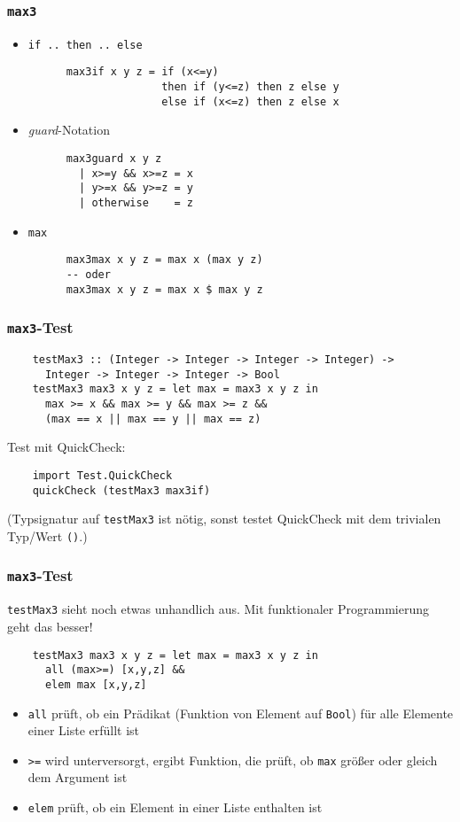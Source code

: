 \documentclass{beamer}
\begin{document}
\begin{frame}[fragile]
  \frametitle{\lstinline{max3}}
  \begin{itemize}
  \item \lstinline{if .. then .. else}
    \pause
    \begin{lstlisting}
      max3if x y z = if (x<=y)
                     then if (y<=z) then z else y
                     else if (x<=z) then z else x
    \end{lstlisting}
    \pause
  \item \emph{guard}-Notation
    \pause
    \begin{lstlisting}
      max3guard x y z
        | x>=y && x>=z = x
        | y>=x && y>=z = y
        | otherwise    = z
    \end{lstlisting}
    \pause
  \item \lstinline{max}
    \pause
    \begin{lstlisting}
      max3max x y z = max x (max y z)
      -- oder
      max3max x y z = max x $ max y z
    \end{lstlisting}
  \end{itemize}
\end{frame}

\begin{frame}[fragile]
  \frametitle{\lstinline{max3}-Test}
  \begin{lstlisting}
    testMax3 :: (Integer -> Integer -> Integer -> Integer) ->
      Integer -> Integer -> Integer -> Bool
    testMax3 max3 x y z = let max = max3 x y z in
      max >= x && max >= y && max >= z &&
      (max == x || max == y || max == z)
  \end{lstlisting}
  \pause
  Test mit QuickCheck:
  \begin{lstlisting}
    import Test.QuickCheck
    quickCheck (testMax3 max3if)
  \end{lstlisting}
  (Typsignatur auf \lstinline{testMax3} ist nötig, sonst testet QuickCheck mit dem trivialen Typ/Wert \lstinline{()}.)
\end{frame}

\begin{frame}[fragile]
  \frametitle{\lstinline{max3}-Test}
  \lstinline{testMax3} sieht noch etwas unhandlich aus.
  Mit funktionaler Programmierung geht das besser!
  \pause
  \begin{lstlisting}
    testMax3 max3 x y z = let max = max3 x y z in
      all (max>=) [x,y,z] &&
      elem max [x,y,z]
  \end{lstlisting}
  \begin{itemize}
  \item \lstinline{all} prüft, ob ein Prädikat (Funktion von Element auf \lstinline{Bool}) für alle Elemente einer Liste erfüllt ist
  \item \lstinline{>=} wird unterversorgt, ergibt Funktion, die prüft, ob \lstinline{max} größer oder gleich dem Argument ist
  \item \lstinline{elem} prüft, ob ein Element in einer Liste enthalten ist
  \end{itemize}
\end{frame}
\end{document}
